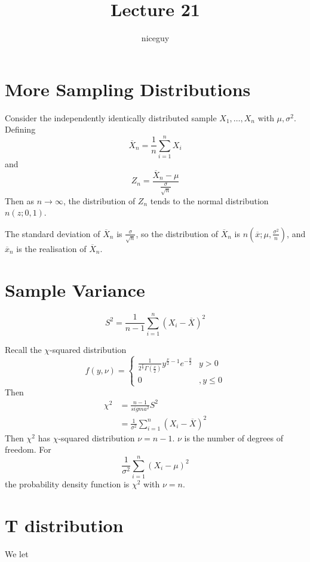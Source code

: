 \documentclass[12pt]{article}
\author{niceguy}
\title{Lecture 21}
\begin{document}
\maketitle

\section{More Sampling Distributions}

\begin{thm}
	Consider the independently identically distributed sample $X_1,\dots,X_n$ with $\mu,\sigma^2$. Defining
	$$\overline{X}_n = \frac{1}{n} \sum_{i=1}^n X_i$$
	and
	$$Z_n = \frac{\overline{X}_n-\mu}{\frac{\sigma}{\sqrt{n}}}$$
	Then as $n \rightarrow \infty$, the distribution of $Z_n$ tends to the normal distribution $n(z;0,1)$.
\end{thm}

The standard deviation of $\overline{X}_n$ is $\frac{\sigma}{\sqrt{n}}$, so the distribution of $\overline{X}_n$ is $n(\overline{x};\mu,\frac{\sigma^2}{n})$, and $\overline{x}_n$ is the realisation of $\overline{X}_n$.

\section{Sample Variance}

$$S^2 = \frac{1}{n-1} \sum_{i=1}^n (X_i - \overline{X})^2$$

Recall the $\chi$-squared distribution
$$f(y,\nu) = \begin{cases} \frac{1}{2^{\frac{\nu}{2}}\Gamma\left(\frac{\nu}{2}\right)}y^{\frac{\nu}{2}-1}e^{-\frac{y}{2}} & y > 0 \\ 0 & , y \leq 0 \end{cases}$$
Then
\begin{align*}
	\chi^2 &= \frac{n-1}{sigma^2} S^2 \\
	       &= \frac{1}{\sigma^2} \sum_{i=1}^n (X_i - \overline{X})^2
\end{align*}
Then $\chi^2$ has $\chi$-squared distribution $\nu = n-1$. $\nu$ is the number of degrees of freedom. For
$$\frac{1}{\sigma^2} \sum_{i=1}^n (X_i - \mu)^2$$
the probability density function is $\chi^2$ with $\nu = n$.

\section{T distribution}

We let
\end{document}

